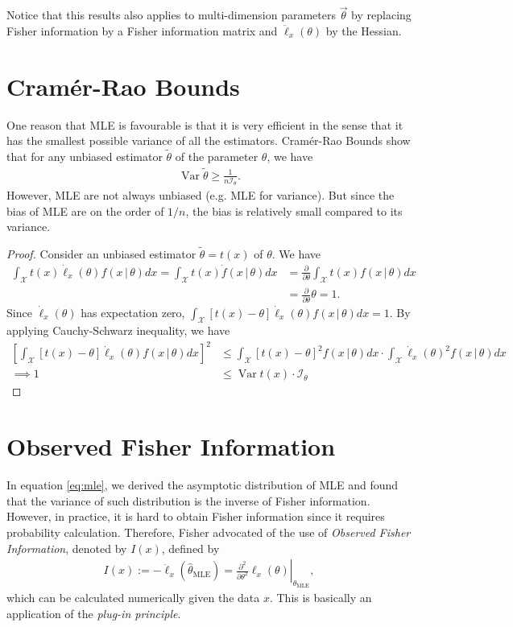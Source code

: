 \documentclass[a4paper,11pt]{article}
\DeclareMathOperator{\var}{Var}
\newcommand{\given}[1][]{\,#1|\,}
\begin{document}
Notice that this results also applies to multi-dimension parameters $\vec{\theta}$
by replacing Fisher information by a Fisher information matrix and $\ddot\ell_{x}(\theta)$ by
the Hessian.

\section{Cram\'er-Rao Bounds}

One reason that MLE is favourable is that it is very efficient in the sense
that it has the smallest possible variance of all the estimators.
Cram\'er-Rao Bounds show that for any unbiased estimator $\tilde{\theta}$
of the parameter $\theta$, we have
\begin{align*}
	\var{\tilde{\theta}}\geq\frac1{n\mathcal{I}_{\theta}}.
\end{align*}
However, MLE are not always unbiased (e.g.\! MLE for variance).
But since the bias of MLE are on the order of $1/n$,
the bias is relatively small compared to its variance.

\begin{proof}
	Consider an unbiased estimator $\tilde{\theta}=t(x)$ of $\theta$.
	We have
	\begin{align*}
		\int_{\mathcal{X}} t(x)\dot\ell_{x}(\theta)f(x\given\theta) d{x}
		= \int_{\mathcal{X}} t(x)\dot f(x\given\theta) d{x}
		&= \frac{\partial}{\partial\theta} \int_{\mathcal{X}} t(x)f(x\given\theta) d{x} \\
		&= \frac{\partial}{\partial\theta} \theta
		= 1.
	\end{align*}
	Since $\dot\ell_{x}(\theta)$ has expectation zero,
	$\int_{\mathcal{X}}[t(x)-\theta]\dot\ell_{x}(\theta)f(x\given\theta)d{x}=1$.
	By applying Cauchy-Schwarz inequality, we have
	\begin{align*}
		\left[\int_{\mathcal{X}}[t(x)-\theta]\dot\ell_{x}(\theta)f(x\given\theta)d{x}\right]^2
		&\leq \int_{\mathcal{X}} [t(x)-\theta]^2 f(x\given\theta) d{x} \cdot
		\int_{\mathcal{X}} \dot\ell_{x}(\theta)^2 f(x\given\theta) d{x} \\
		\implies 1 &\leq \var{t(x)} \cdot \mathcal{I}_{\theta}
	\end{align*}
\end{proof}

\section{Observed Fisher Information}

In equation \eqref{eq:mle},
we derived the asymptotic distribution of MLE and found that
the variance of such distribution is the inverse of Fisher information.
However, in practice, it is hard to obtain Fisher information since it 
requires probability calculation.
Therefore, Fisher advocated of the use of \emph{Observed Fisher Information},
denoted by $I(x)$, defined by
\begin{align*}
	I(x)
	:= -\ddot\ell_{x}(\hat{\theta}_{\text{MLE}})
	= \left. \frac{\partial^2}{\partial\theta^2} \ell_{x}(\theta) \right|_{\hat{\theta}_{\text{MLE}}},
\end{align*}
which can be calculated numerically given the data $x$.
This is basically an application of the \emph{plug-in principle}.
\end{document}
